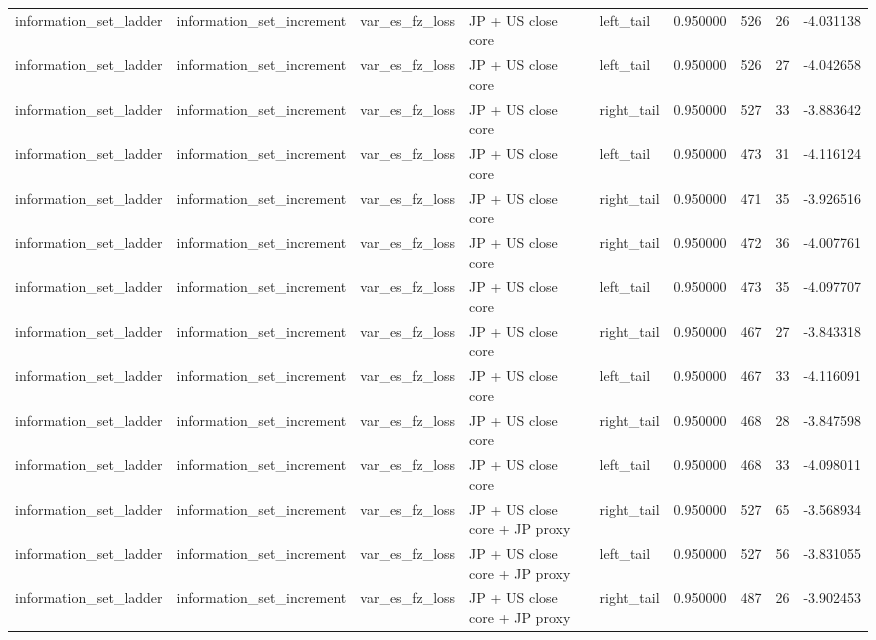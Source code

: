 \begin{tabular}{lllllrrr}
information\_set\_ladder & information\_set\_increment & var\_es\_fz\_loss & JP + US close core & left\_tail & 0.950000 & 526 & 26 & -4.031138 \\
information\_set\_ladder & information\_set\_increment & var\_es\_fz\_loss & JP + US close core & left\_tail & 0.950000 & 526 & 27 & -4.042658 \\
information\_set\_ladder & information\_set\_increment & var\_es\_fz\_loss & JP + US close core & right\_tail & 0.950000 & 527 & 33 & -3.883642 \\
information\_set\_ladder & information\_set\_increment & var\_es\_fz\_loss & JP + US close core & left\_tail & 0.950000 & 473 & 31 & -4.116124 \\
information\_set\_ladder & information\_set\_increment & var\_es\_fz\_loss & JP + US close core & right\_tail & 0.950000 & 471 & 35 & -3.926516 \\
information\_set\_ladder & information\_set\_increment & var\_es\_fz\_loss & JP + US close core & right\_tail & 0.950000 & 472 & 36 & -4.007761 \\
information\_set\_ladder & information\_set\_increment & var\_es\_fz\_loss & JP + US close core & left\_tail & 0.950000 & 473 & 35 & -4.097707 \\
information\_set\_ladder & information\_set\_increment & var\_es\_fz\_loss & JP + US close core & right\_tail & 0.950000 & 467 & 27 & -3.843318 \\
information\_set\_ladder & information\_set\_increment & var\_es\_fz\_loss & JP + US close core & left\_tail & 0.950000 & 467 & 33 & -4.116091 \\
information\_set\_ladder & information\_set\_increment & var\_es\_fz\_loss & JP + US close core & right\_tail & 0.950000 & 468 & 28 & -3.847598 \\
information\_set\_ladder & information\_set\_increment & var\_es\_fz\_loss & JP + US close core & left\_tail & 0.950000 & 468 & 33 & -4.098011 \\
information\_set\_ladder & information\_set\_increment & var\_es\_fz\_loss & JP + US close core + JP proxy & right\_tail & 0.950000 & 527 & 65 & -3.568934 \\
information\_set\_ladder & information\_set\_increment & var\_es\_fz\_loss & JP + US close core + JP proxy & left\_tail & 0.950000 & 527 & 56 & -3.831055 \\
information\_set\_ladder & information\_set\_increment & var\_es\_fz\_loss & JP + US close core + JP proxy & right\_tail & 0.950000 & 487 & 26 & -3.902453 \\

\end{tabular}
